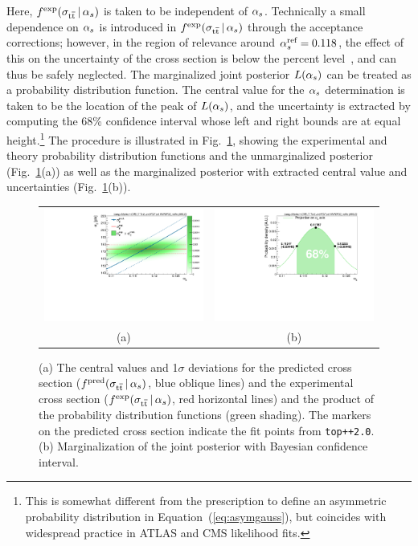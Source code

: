 %
Here, $f^{\text{exp}}(\sigma_{\mathrm{t}\overline{\mathrm{t}}}\,|\,\alpha_s)$ is taken to be independent of
$\alpha_s$. Technically a small dependence on $\alpha_s$ is introduced in
$f^{\text{exp}}(\sigma_{\mathrm{t}\overline{\mathrm{t}}}\,|\,\alpha_s)$ through the acceptance corrections;
however, in the region of relevance around $\alpha_s^{\text{ref}} = 0.118$,
the effect of this on the uncertainty of the cross section is below
the percent level~\cite{Chatrchyan:2013haa}, and can thus be safely
neglected.  
%
The marginalized joint posterior $L(\alpha_s)$ can be treated
as a probability distribution function. 
%
The central value for the $\alpha_s$ determination is taken to be the
location of the peak of $L(\alpha_s)$, and the
%
uncertainty is extracted by computing the 68\% confidence interval
whose left and right bounds are at equal height.\footnote{This is
  somewhat different from the prescription to define an asymmetric
  probability distribution in Equation~(\ref{eq:asymgauss}), but coincides
  with widespread practice in ATLAS and CMS likelihood fits.}
%
The procedure is illustrated in Fig.~\ref{fig:fullproc}, showing the
experimental and theory probability distribution functions and the
unmarginalized posterior (Fig.~\ref{fig:fullproc}(a)) as well as the
marginalized posterior with extracted central value and uncertainties
(Fig.~\ref{fig:fullproc}(b)).


\begin{figure}[htb]
\centering
\begin{tabular}{cc}
\includegraphics[width=0.5\linewidth]{img/alphas/fullproc.pdf}
&
\includegraphics[width=0.5\linewidth]{img/alphas/alphasDistribution.pdf}
\\
(a) & (b)
\end{tabular}
\vspace{-0.3cm}
\caption{
  (a) The central values and 1$\sigma$ deviations for the predicted cross
  section ($f^{\text{pred}}(\sigma_{\mathrm{t}\overline{\mathrm{t}}}\,|\,\alpha_s)$, blue oblique lines) and
  the experimental cross section ($f^{\text{exp}}(\sigma_{\mathrm{t}\overline{\mathrm{t}}}\,|\,\alpha_s)$,
  red horizontal lines) 
  and the product of the probability distribution functions (green
  shading).
  The markers on the predicted cross
  section indicate the fit points from \texttt{top++2.0}. (b)
  Marginalization of the joint posterior with Bayesian confidence
  interval.
  }
\label{fig:fullproc}
\end{figure}


